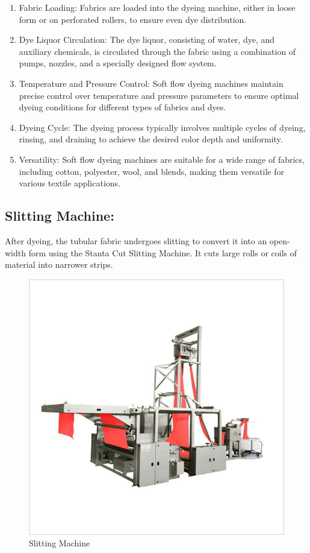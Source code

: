 \begin{enumerate}
\item
  Fabric Loading: Fabrics are loaded into the dyeing machine, either in
  loose form or on perforated rollers, to ensure even dye distribution.
\item
  Dye Liquor Circulation: The dye liquor, consisting of water, dye, and
  auxiliary chemicals, is circulated through the fabric using a
  combination of pumps, nozzles, and a specially designed flow system.
\item
  Temperature and Pressure Control: Soft flow dyeing machines maintain
  precise control over temperature and pressure parameters to ensure
  optimal dyeing conditions for different types of fabrics and dyes.
\item
  Dyeing Cycle: The dyeing process typically involves multiple cycles of
  dyeing, rinsing, and draining to achieve the desired color depth and
  uniformity.
\item
  Versatility: Soft flow dyeing machines are suitable for a wide range
  of fabrics, including cotton, polyester, wool, and blends, making them
  versatile for various textile applications.
\end{enumerate}

\subsection{Slitting Machine:}

After dyeing, the tubular fabric undergoes slitting to convert it into an open-width form using the Stanta Cut Slitting Machine.
It cuts large rolls or coils of material into narrower strips.



\begin{figure}[h!]
  \centering
  \includegraphics[width=0.8\linewidth]{figs/production/image2.jpg}
  \caption{Slitting Machine}
  \label{fig:Slitting Machine}
\end{figure}


